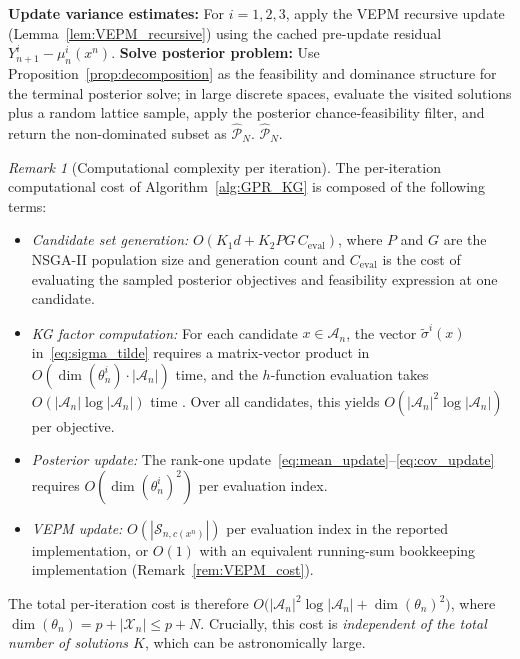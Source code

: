 \documentclass[12pt]{article}
\theoremstyle{plain}
\theoremstyle{definition}
\theoremstyle{remark}
\newtheorem{remark}{Remark}[section]
\begin{document}
\begin{algorithm}[ht]
\begin{algorithmic}[1]
  \State \textbf{Update variance estimates:} For $i = 1,2,3$, apply the VEPM recursive update (Lemma~\ref{lem:VEPM_recursive}) using the cached pre-update residual $Y^i_{n+1}-\mu^i_n(x^n)$.
\EndFor
\State \textbf{Solve posterior problem:} Use Proposition~\ref{prop:decomposition} as the feasibility and dominance structure for the terminal posterior solve; in large discrete spaces, evaluate the visited solutions plus a random lattice sample, apply the posterior chance-feasibility filter, and return the non-dominated subset as $\hat{\mathcal{P}}_N$.
\State \Return $\hat{\mathcal{P}}_N$.
\end{algorithmic}
\end{algorithm}

\begin{remark}[Computational complexity per iteration]\label{rem:complexity}
The per-iteration computational cost of Algorithm~\ref{alg:GPR_KG} is composed of the following terms:
\begin{itemize}
  \item \emph{Candidate set generation:} $O(K_1 d + K_2 P G\,C_{\mathrm{eval}})$, where $P$ and $G$ are the NSGA-II population size and generation count and $C_{\mathrm{eval}}$ is the cost of evaluating the sampled posterior objectives and feasibility expression at one candidate.
  \item \emph{KG factor computation:} For each candidate $x \in \mathcal{A}_n$, the vector $\tilde{\sigma}^i(x)$ in~\eqref{eq:sigma_tilde} requires a matrix-vector product in $O(\dim(\theta^i_n) \cdot |\mathcal{A}_n|)$ time, and the $h$-function evaluation takes $O(|\mathcal{A}_n| \log |\mathcal{A}_n|)$ time \citep{Frazier2009}. Over all candidates, this yields $O(|\mathcal{A}_n|^2 \log |\mathcal{A}_n|)$ per objective.
  \item \emph{Posterior update:} The rank-one update~\eqref{eq:mean_update}--\eqref{eq:cov_update} requires $O(\dim(\theta^i_n)^2)$ per evaluation index.
  \item \emph{VEPM update:} $O(|\mathcal{S}_{n,c(x^n)}|)$ per evaluation index in the reported implementation, or $O(1)$ with an equivalent running-sum bookkeeping implementation (Remark~\ref{rem:VEPM_cost}).
\end{itemize}
The total per-iteration cost is therefore $O\!\bigl(|\mathcal{A}_n|^2 \log |\mathcal{A}_n| + \dim(\theta_n)^2\bigr)$, where $\dim(\theta_n) = p + |\mathcal{X}_n| \leq p + N$. Crucially, this cost is \emph{independent of the total number of solutions $K$}, which can be astronomically large.
\end{remark}
\end{document}
